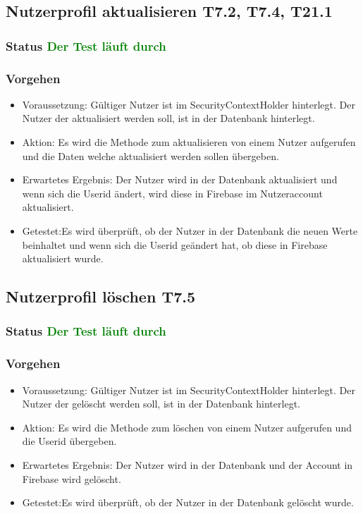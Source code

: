 \subsection{Nutzerprofil aktualisieren T7.2, T7.4, T21.1}
\subsubsection{Status \textcolor{green}{ Der Test läuft durch} }
\subsubsection{Vorgehen}
\begin{itemize}
	\item Voraussetzung: Gültiger Nutzer ist im SecurityContextHolder hinterlegt. Der Nutzer der aktualisiert werden soll, ist in der Datenbank hinterlegt.
	\item Aktion: Es wird die Methode zum aktualisieren von einem Nutzer aufgerufen und die Daten welche aktualisiert werden sollen übergeben.
	\item Erwartetes Ergebnis: Der Nutzer wird in der Datenbank aktualisiert und wenn sich die Userid ändert, wird diese in Firebase im Nutzeraccount aktualisiert.
	\item Getestet:Es wird überprüft, ob der Nutzer in der Datenbank die neuen Werte beinhaltet und wenn sich die Userid geändert hat, ob diese in Firebase aktualisiert wurde.
\end{itemize}

\subsection{Nutzerprofil löschen T7.5}
\subsubsection{Status \textcolor{green}{ Der Test läuft durch} }
\subsubsection{Vorgehen}
\begin{itemize}
	\item Voraussetzung: Gültiger Nutzer ist im SecurityContextHolder hinterlegt. Der Nutzer der gelöscht werden soll, ist in der Datenbank hinterlegt.
	\item Aktion: Es wird die Methode zum löschen von einem Nutzer aufgerufen und die Userid übergeben.
	\item Erwartetes Ergebnis: Der Nutzer wird in der Datenbank und der Account in Firebase wird gelöscht.
	\item Getestet:Es wird überprüft, ob der Nutzer in der Datenbank gelöscht wurde.
\end{itemize}

